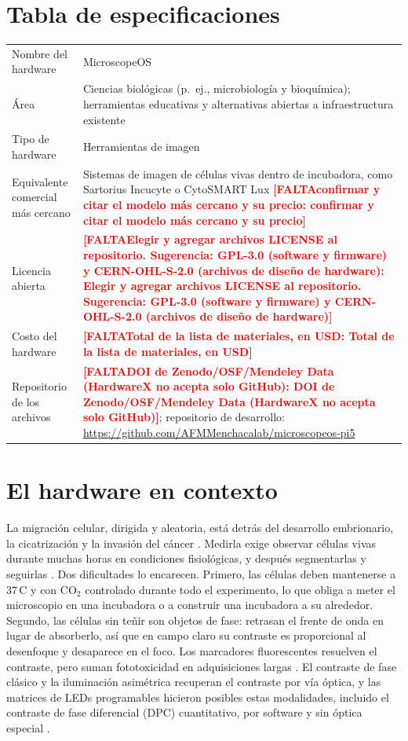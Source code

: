 \documentclass[preprint,12pt]{elsarticle}
\DeclareRobustCommand{\TODO}[1]{\textcolor{red}{\textbf{[FALTA\ifx\relax#1\relax\else: #1\fi]}}}
\begin{document}
\section*{Tabla de especificaciones}

\noindent
\begin{tabularx}{\textwidth}{>{\raggedright\arraybackslash}p{}L}
\toprule
Nombre del hardware & MicroscopeOS \\
Área & Ciencias biológicas (p.~ej., microbiología y bioquímica);
  herramientas educativas y alternativas abiertas a infraestructura
  existente \\
Tipo de hardware & Herramientas de imagen \\
Equivalente comercial más cercano & Sistemas de imagen de células vivas
  dentro de incubadora, como Sartorius Incucyte o CytoSMART Lux
  \TODO{confirmar y citar el modelo más cercano y su precio} \\
Licencia abierta & \TODO{Elegir y agregar archivos LICENSE al
  repositorio. Sugerencia: GPL-3.0 (software y firmware) y CERN-OHL-S-2.0
  (archivos de diseño de hardware)} \\
Costo del hardware & \TODO{Total de la lista de materiales, en USD} \\
Repositorio de los archivos & \TODO{DOI de Zenodo/OSF/Mendeley Data
  (HardwareX no acepta solo GitHub)}; repositorio de desarrollo:
  \url{https://github.com/AFMMenchacalab/microscopeos-pi5} \\
\bottomrule
\end{tabularx}

\section{El hardware en contexto}

La migración celular, dirigida y aleatoria, está detrás del desarrollo
embrionario, la cicatrización y la invasión del cáncer \cite{Ref003}.
Medirla exige observar células vivas durante muchas horas en condiciones
fisiológicas, y después segmentarlas y seguirlas
\cite{WuWirtz2026Methods}. Dos dificultades lo encarecen. Primero, las
células deben mantenerse a 37\,\textdegree C y con CO$_2$ controlado
durante todo el experimento, lo que obliga a meter el microscopio en una
incubadora o a construir una incubadora a su alrededor. Segundo, las
células sin teñir son objetos de fase: retrasan el frente de onda en lugar
de absorberlo, así que en campo claro su contraste es proporcional al
desenfoque y desaparece en el foco. Los marcadores fluorescentes resuelven
el contraste, pero suman fototoxicidad en adquisiciones largas
\cite{Icha2017,Laissue2017}. El contraste de fase clásico
\cite{Zernike1942} y la iluminación asimétrica
\cite{Kachar1985,Mehta2009} recuperan el contraste por vía óptica, y las
matrices de LEDs programables hicieron posibles estas modalidades, incluido
el contraste de fase diferencial (DPC) cuantitativo, por software y sin
óptica especial
\cite{Zheng2011LED,Liu2014LED,Tian2014DPC3D,Tian2015DPC,Lee2015Color,Chen2018DPCaberr}.
\end{document}
